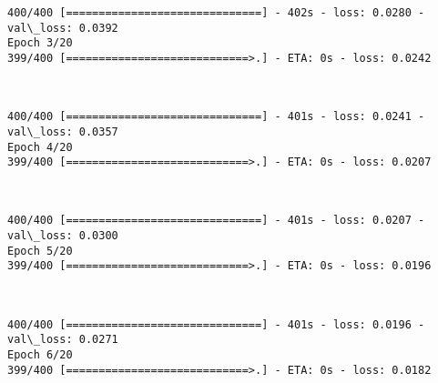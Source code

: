 \documentclass[11pt]{article}
\begin{document}
    \begin{Verbatim}[commandchars=\\\{\}]
400/400 [==============================] - 402s - loss: 0.0280 - val\_loss: 0.0392
Epoch 3/20
399/400 [============================>.] - ETA: 0s - loss: 0.0242
    \end{Verbatim}

    \begin{center}
    \end{center}
    { \hspace*{\fill} \\}
    
    \begin{Verbatim}[commandchars=\\\{\}]
400/400 [==============================] - 401s - loss: 0.0241 - val\_loss: 0.0357
Epoch 4/20
399/400 [============================>.] - ETA: 0s - loss: 0.0207
    \end{Verbatim}

    \begin{center}
    \end{center}
    { \hspace*{\fill} \\}
    
    \begin{Verbatim}[commandchars=\\\{\}]
400/400 [==============================] - 401s - loss: 0.0207 - val\_loss: 0.0300
Epoch 5/20
399/400 [============================>.] - ETA: 0s - loss: 0.0196
    \end{Verbatim}

    \begin{center}
    \end{center}
    { \hspace*{\fill} \\}
    
    \begin{Verbatim}[commandchars=\\\{\}]
400/400 [==============================] - 401s - loss: 0.0196 - val\_loss: 0.0271
Epoch 6/20
399/400 [============================>.] - ETA: 0s - loss: 0.0182
    \end{Verbatim}

    \begin{center}
    \end{center}
    { \hspace*{\fill} \\}
    
\end{document}
